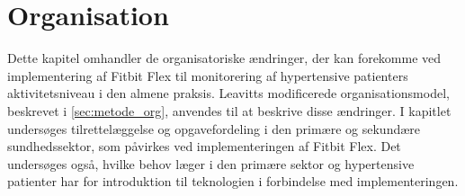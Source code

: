 \chapter{Organisation}
Dette kapitel omhandler de organisatoriske ændringer, der kan forekomme ved implementering af Fitbit Flex til monitorering af hypertensive patienters aktivitetsniveau i den almene praksis. Leavitts modificerede organisationsmodel, beskrevet i \autoref{sec:metode_org}, anvendes til at beskrive disse ændringer. I kapitlet undersøges tilrettelæggelse og opgavefordeling i den primære og sekundære sundhedssektor, som påvirkes ved implementeringen af Fitbit Flex. Det undersøges også, hvilke behov læger i den primære sektor og hypertensive patienter har for introduktion til teknologien i forbindelse med implementeringen.   

